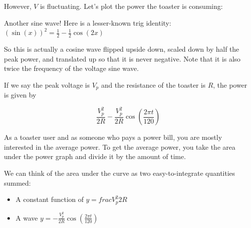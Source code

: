 However, $V$ is fluctuating. Let's plot the power the toaster is consuming:


Another sine wave! Here is a lesser-known trig identity: $\left( \sin(x) \right)^2 = \frac{1}{2} - \frac{1}{2}\cos(2x)$

So this is actually a cosine wave flipped upside down, scaled down by
half the peak power, and translated up so that it is never
negative. Note that it is also twice the frequency of the voltage sine
wave.

If we say the peak voltage is $V_p$ and the resistance of the toaster
is $R$, the power is given by

$$\frac{V_p^2}{2R} - \frac{V_p^2}{2R} \cos \left(\frac{2\pi t}{120} \right)$$

As a toaster user and as someone who pays a power bill, you are mostly
interested in the average power.  To get the average power, you take
the area under the power graph and divide it by the amount of time.

We can think of the area under the curve as two easy-to-integrate quantities summed:
\begin{itemize}
\item A constant function of $y = frac{V_p^2}{2R}$
\item A wave $y = - \frac{V_p^2}{2R} \cos \left(\frac{2\pi t}{120} \right)$
\end{itemize}

